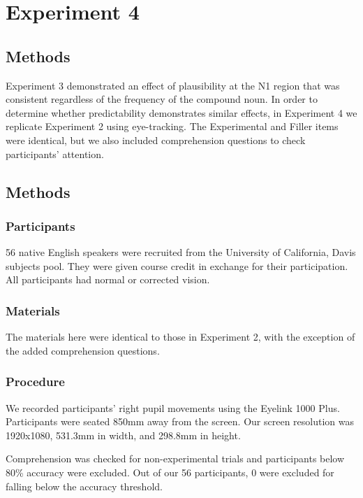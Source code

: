 \documentclass[
  12pt,
  letterpaper,
]{scrreprt}
\begin{document}
\section{Experiment 4}\label{experiment-4}

\subsection{Methods}\label{methods-3}

Experiment 3 demonstrated an effect of plausibility at the N1 region
that was consistent regardless of the frequency of the compound noun. In
order to determine whether predictability demonstrates similar effects,
in Experiment 4 we replicate Experiment 2 using eye-tracking. The
Experimental and Filler items were identical, but we also included
comprehension questions to check participants' attention.

\subsection{Methods}\label{methods-4}

\subsubsection{Participants}\label{participants-3}

56 native English speakers were recruited from the University of
California, Davis subjects pool. They were given course credit in
exchange for their participation. All participants had normal or
corrected vision.

\subsubsection{Materials}\label{materials-1}

The materials here were identical to those in Experiment 2, with the
exception of the added comprehension questions.

\subsubsection{Procedure}\label{procedure-2}

We recorded participants' right pupil movements using the Eyelink 1000
Plus. Participants were seated 850mm away from the screen. Our screen
resolution was 1920x1080, 531.3mm in width, and 298.8mm in height.

Comprehension was checked for non-experimental trials and participants
below 80\% accuracy were excluded. Out of our 56 participants, 0 were
excluded for falling below the accuracy threshold.
\end{document}
